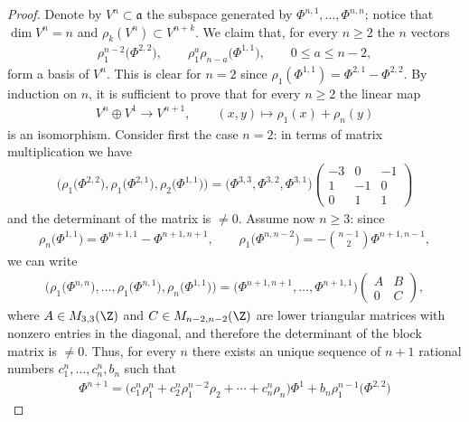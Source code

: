 \begin{proof}Denote by $V^n\subset \mathfrak{a}$ the subspace generated by $\Phi^{n,1},\ldots,\Phi^{n,n}$; notice that $\dim V^n=n$ and
$\rho_k(V^n)\subset V^{n+k}$. We claim that, for every $n\ge 2$ the $n$ vectors
\begin{gather*}\rho_1^{n-2}\big(\Phi^{2,2}\big),\qquad \rho_1^a\rho_{n-a}\big(\Phi^{1,1}\big),\qquad 0\le a\le n-2,\end{gather*}
form a basis of $V^{n}$. This is clear for $n=2$ since $\rho_1(\Phi^{1,1})=\Phi^{2,1}-\Phi^{2,2}$.
By induction on $n$, it is suf\/f\/icient to prove that for every $n\ge 2$ the linear map
\begin{gather*} V^{n}\oplus V^1\to V^{n+1},\qquad (x,y)\mapsto \rho_1(x)+\rho_n(y)\end{gather*}
is an isomorphism. Consider f\/irst the case $n=2$: in terms of matrix multiplication we have
\begin{gather*} \big(\rho_1\big(\Phi^{2,2}\big),\rho_1\big(\Phi^{2,1}\big),\rho_2\big(\Phi^{1,1}\big)\big)=\big(\Phi^{3,3},\Phi^{3,2},\Phi^{3,1}\big)
\begin{pmatrix}-3&0&-1\\
1&-1&0\\
0&1&1\end{pmatrix}\end{gather*}
and the determinant of the matrix is $\not=0$. Assume now $n\ge 3$: since
\begin{gather*} \rho_n\big(\Phi^{1,1}\big)=\Phi^{n+1,1}-\Phi^{n+1,n+1}
,\qquad\rho_1\big(\Phi^{n,n-2}\big)=-\binom{n-1}{2}\Phi^{n+1,n-1},\end{gather*}
we can write
\begin{gather*} \big(\rho_1\big(\Phi^{n,n}\big),\ldots,\rho_1\big(\Phi^{n,1}\big),\rho_n\big(\Phi^{1,1}\big)\big)=
\big(\Phi^{n+1,n+1},\ldots,\Phi^{n+1,1}\big)
\begin{pmatrix}A&B\\
0&C\end{pmatrix},\end{gather*}
where $A\in M_{3,3}(\Z)$ and $C\in M_{n-2,n-2}(\Z)$ are lower triangular matrices with nonzero entries in the diagonal, and therefore the determinant of the block matrix is $\not=0$. Thus, for every $n$ there exists an unique sequence of $n+1$ rational numbers $c^n_1,\ldots,c^n_n,b_n$ such that
\begin{gather*}\Phi^{n+1}=\big(c^n_1\rho_1^n+c^n_2\rho_1^{n-2}\rho_2+\cdots+c^n_n\rho_n\big)\Phi^1+
b_n\rho_1^{n-1}\big(\Phi^{2,2}\big)\end{gather*}

\end{proof}
